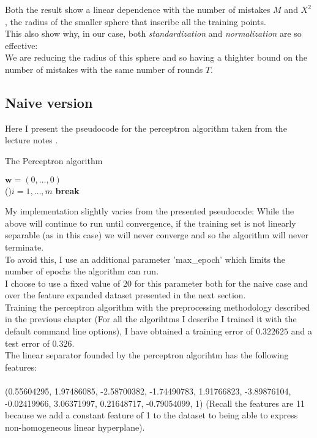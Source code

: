 Both the result show a linear dependence with the number of mistakes $M$ and  $X^2$, the radius of the smaller sphere that inscribe all the training points.\\
This also show why, in our case, both \textit{standardization} and \textit{normalization} are so effective:\\
We are reducing the radius of this sphere and so having a thighter bound on the number of mistakes with the same number of rounds $T$.\\


\subsection{Naive version}
Here I present the pseudocode for the perceptron algorithm taken from the lecture notes \cite{lect_notes}.\\
\begin{algorithm}[H]
    \SetAlgoLined
    \DontPrintSemicolon
    \caption{The Perceptron algorithm}
    $\boldsymbol{w} = (0, \dots, 0)$\\
 {  
    \For(){$i = 1, \dots, m$}{
    }
     {
        \textbf{break}
    } 
   }
\end{algorithm}

My implementation slightly varies from the presented pseudocode:
While the above will continue to run until convergence, if the training set is not linearly separable (as in this case) we will never converge and so the algorithm will never terminate.\\
To avoid this, I use an additional parameter 'max\_epoch' which limits the number of epochs the algorithm can run.\\
I choose to use a fixed value of 20 for this parameter both for the naive case and over the feature expanded dataset presented in the next section.\\
Training the perceptron algorithm with the preprocessing methodology described in the previous chapter (For all the algorihtms I describe I trained it with the default command line options), I have obtained a training error of $0.322625$ and a test error of $0.326$.\\
The linear separator founded by the perceptron algorihtm has the following features:\\\\
(0.55604295,  1.97486085, -2.58700382, -1.74490783,  1.91766823, -3.89876104,\\
 -0.02419966,  3.06371997,  0.21648717, -0.79054099,  1)
(Recall the features are 11 because we add a constant feature of 1 to the dataset to being able to express non-homogeneous linear hyperplane).\\

